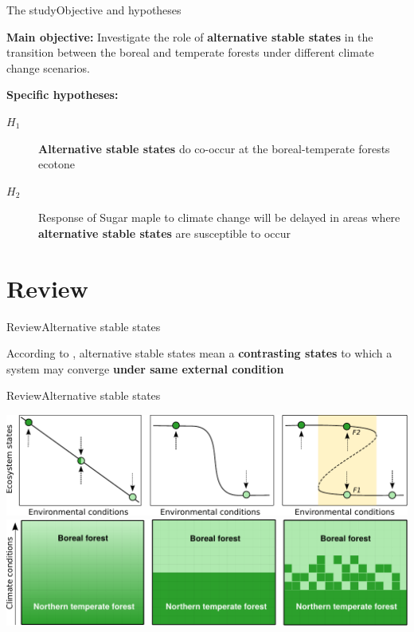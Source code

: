 \documentclass[table]{eecslides}
\begin{document}
\begin{frame}{The study}{Objective and hypotheses}

\textbf{Main objective:} Investigate the role of \alert{\textbf{alternative stable states}} in the transition between the boreal and
temperate forests under different climate change scenarios.

\vfill

\textbf{Specific hypotheses: }

\begin{description}
	\item [$H_1$] \alert{\textbf{Alternative stable states}} do co-occur at the boreal-temperate forests ecotone
	\item [$H_2$] Response of Sugar maple to climate change will be delayed in areas where \alert{\textbf{alternative stable states}} are susceptible to occur
\end{description}

\end{frame}

\section{Review}

\begin{frame}{Review}{Alternative stable states}

According to \cite{scheffer2009critical}, alternative stable states mean a \textbf{contrasting states} to which a system may converge \textbf{under same external condition}

\end{frame}


\begin{frame}{Review}{Alternative stable states}

\begin{center}
	\includegraphics[width=.7\paperwidth]{Figs/ass1.pdf}\\
	\vfill
	\pause
	\includegraphics[width=.7\paperwidth]{Figs/ass2.pdf}
\end{center}

\end{frame}
\end{document}
